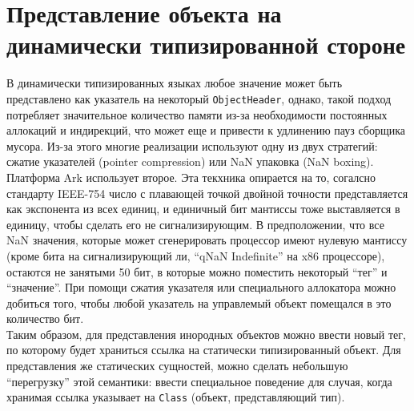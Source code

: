 \documentclass[times,specification,annotation]{itmo-student-thesis}
\begin{document}
\section{Представление объекта на динамически типизированной стороне}
В динамически типизированных языках любое значение может быть представлено как указатель на некоторый \texttt{ObjectHeader}, однако, такой подход потребляет значительное количество памяти из-за необходимости постоянных аллокаций и индирекций, что может еще и привести к удлинению пауз сборщика мусора. Из-за этого многие реализации используют одну из двух стратегий: сжатие указателей (pointer compression) или NaN упаковка (NaN boxing). Платформа Ark использует второе. Эта текхника опирается на то, согалсно стандарту IEEE-754 число с плавающей точкой двойной точности представляется как экспонента из всех единиц, и единичный бит мантиссы тоже выставляется в единицу, чтобы сделать его не сигнализирующим. В предположении, что все NaN значения, которые может сгенерировать процессор имеют нулевую мантиссу (кроме бита на сигнализирующий ли, ``qNaN Indefinite'' на x86 процессоре), остаются не занятыми 50 бит, в которые можно поместить некоторый ``тег'' и ``значение''. При помощи сжатия указателя или специального аллокатора можно добиться того, чтобы любой указатель на управлемый объект помещался в это количество бит.\\
Таким образом, для представления инородных объектов можно ввести новый тег, по которому будет храниться ссылка на статически типизированный объект. Для представления же статических сущностей, можно сделать небольшую ``перегрузку'' этой семантики: ввести специальное поведение для случая, когда хранимая ссылка указывает на \texttt{Class} (объект, представляющий тип).
\end{document}
